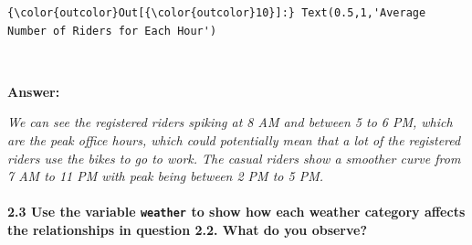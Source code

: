 \documentclass[11pt]{article}
\begin{document}
\begin{Verbatim}[commandchars=\\\{\}]
{\color{outcolor}Out[{\color{outcolor}10}]:} Text(0.5,1,'Average Number of Riders for Each Hour')
\end{Verbatim}
            
    \begin{center}
    \end{center}
    { \hspace*{\fill} \\}
    
    \textbf{Answer:}

\emph{We can see the registered riders spiking at 8 AM and between 5 to
6 PM, which are the peak office hours, which could potentially mean that
a lot of the registered riders use the bikes to go to work. The casual
riders show a smoother curve from 7 AM to 11 PM with peak being between
2 PM to 5 PM.}

    \paragraph{\texorpdfstring{\textbf{2.3} Use the variable
\texttt{weather} to show how each weather category affects the
relationships in question 2.2. What do you
observe?}{2.3 Use the variable weather to show how each weather category affects the relationships in question 2.2. What do you observe?}}\label{use-the-variable-weather-to-show-how-each-weather-category-affects-the-relationships-in-question-2.2.-what-do-you-observe}
\end{document}
